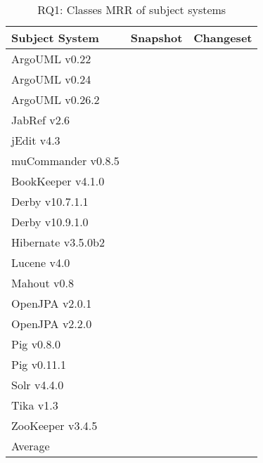 \begin{table}[t]
\renewcommand{\arraystretch}{1.3}
\footnotesize
\centering
\caption{RQ1: Classes MRR of subject systems}
\begin{tabular}{lrr}
    \toprule
    Subject System      & Snapshot  & Changeset \\
    \midrule
    ArgoUML v0.22       &           &           \\
    ArgoUML v0.24       &           &           \\
    ArgoUML v0.26.2     &           &           \\
    JabRef v2.6         &           &           \\
    jEdit v4.3          &           &           \\
    muCommander v0.8.5  &           &           \\
    BookKeeper v4.1.0   &           &           \\
    Derby v10.7.1.1     &           &           \\
    Derby v10.9.1.0     &           &           \\
    Hibernate v3.5.0b2  &           &           \\
    Lucene v4.0         &           &           \\
    Mahout v0.8         &           &           \\
    OpenJPA v2.0.1      &           &           \\
    OpenJPA v2.2.0      &           &           \\
    Pig v0.8.0          &           &           \\
    Pig v0.11.1         &           &           \\
    Solr v4.4.0         &           &           \\
    Tika v1.3           &           &           \\
    ZooKeeper v3.4.5    &           &           \\
    \midrule
    Average             &           &           \\
    \bottomrule
\end{tabular}
\label{table:rq1classes}
\end{table}

